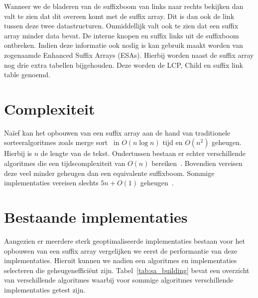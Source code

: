 Wanneer we de bladeren van de suffixboom van links naar rechts bekijken dan valt te zien dat dit overeen komt met de suffix array.
Dit is dan ook de link tussen deze twee datastructuren.
Onmiddellijk valt ook te zien dat een suffix array minder data bevat.
De interne knopen en suffix links uit de suffixboom ontbreken.
Indien deze informatie ook nodig is kan gebruik maakt worden van zogenaamde Enhanced Suffix Arrays (ESAs).
Hierbij worden naast de suffix array nog drie extra tabellen bijgehouden.
Deze worden de LCP, Child en suffix link table genoemd.


\section{Complexiteit}\label{sec:complexiteit}
Naïef kan het opbouwen van een suffix array aan de hand van traditionele sorteeralgoritmes zoals merge sort~\cite{mergeSort} in $O(n \log n)$ tijd en $O(n^2)$ geheugen.
Hierbij is $n$ de lengte van de tekst.
Ondertussen bestaan er echter verschillende algoritmes die een tijdscomplexiteit van $O(n)$ bereiken~\cite{sais, ko_alura, radixSA, dark_archon, libdivsufsort}.
Bovendien vereisen deze veel minder geheugen dan een equivalente suffixboom.
Sommige implementaties vereisen slechts $5n + O(1)$ geheugen~\cite{dark_archon, libdivsufsort}.


\section{Bestaande implementaties}\label{sec:bestaande-implementaties}
Aangezien er meerdere sterk geoptimaliseerde implementaties bestaan voor het opbouwen van een suffix array vergelijken we eerst de performantie van deze implementaties.
Hieruit kunnen we nadien een algoritmes en implementaties selecteren die geheugenefficiënt zijn.
Tabel~\ref{tab:sa_building} bevat een overzicht van verschillende algoritmes waarbij voor sommige algoritmes verschillende implementaties getest zijn.

